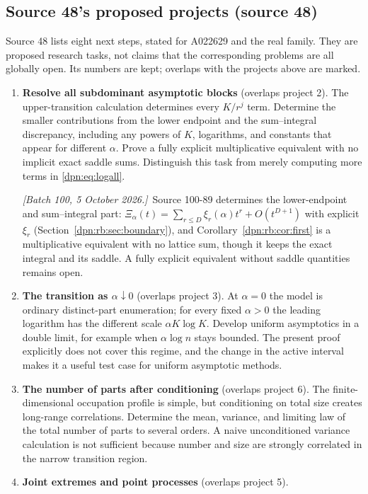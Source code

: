 \documentclass[11pt]{article}
\numberwithin{equation}{section}
\theoremstyle{definition}\newtheorem{definition}[theorem]{Definition}
\theoremstyle{remark}\newtheorem{remark}[theorem]{Remark}
\newcommand{\src}[1]{\textup{(source #1)}}
\newcommand{\writenoted}[1]{\par\smallskip\noindent\textit{[Batch 100, 5 October 2026.]}\ #1\par\smallskip}
\begin{document}
\subsection{Source 48's proposed projects \src{48}}
Source 48 lists eight next steps, stated for A022629 and the real family.
They are proposed research tasks, not claims that the corresponding problems
are all globally open.  Its numbers are kept; overlaps with the projects above
are marked.
\begin{enumerate}[label=\textbf{48.\arabic*}, leftmargin=*]
\item \textbf{Resolve all subdominant asymptotic blocks} (overlaps project 2).
The upper-transition calculation determines every $K/r^j$ term.  Determine the
smaller contributions from the lower endpoint and the sum--integral
discrepancy, including any powers of $K$, logarithms, and constants that
appear for different $\alpha$.  Prove a fully explicit multiplicative
equivalent with no implicit exact saddle sums.  Distinguish this task from
merely computing more terms in \eqref{dpn:eq:logall}.
\writenoted{Source 100-89 determines the lower-endpoint and sum--integral
part: $\Xi_\alpha(t)=\sum_{r\le D}\xi_r(\alpha)t^r+O(t^{D+1})$ with explicit
$\xi_r$ (Section~\ref{dpn:rb:sec:boundary}), and
Corollary~\ref{dpn:rb:cor:first} is a multiplicative equivalent with no lattice
sum, though it keeps the exact integral and its saddle.  A fully explicit
equivalent without saddle quantities remains open.}
\item \textbf{The transition as $\alpha\downarrow0$} (overlaps project 3).
At $\alpha=0$ the model is ordinary distinct-part enumeration; for every fixed
$\alpha>0$ the leading logarithm has the different scale $\alpha K\log K$.
Develop uniform asymptotics in a double limit, for example when $\alpha\log n$
stays bounded.  The present proof explicitly does not cover this regime, and
the change in the active interval makes it a useful test case for uniform
asymptotic methods.
\item \textbf{The number of parts after conditioning} (overlaps project 6).
The finite-dimensional occupation profile is simple, but conditioning on total
size creates long-range correlations.  Determine the mean, variance, and
limiting law of the total number of parts to several orders.  A naive
unconditioned variance calculation is not sufficient because number and size
are strongly correlated in the narrow transition region.
\item \textbf{Joint extremes and point processes} (overlaps project 5).

\end{enumerate}
\end{document}
